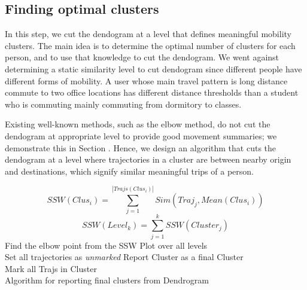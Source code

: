 \subsection{Finding optimal clusters}
In this step, we cut the dendogram at a level that defines meaningful mobility clusters. The main idea is to determine the optimal number of clusters for each person, and to use that knowledge to cut the dendogram. We went against determining a static similarity level to cut dendogram since different people have different forms of mobility. A user whose main travel pattern is long distance commute to two office locations has different distance thresholds than a student who is commuting mainly commuting from dormitory to classes. 

Existing well-known methods, such as the elbow method, do not cut the dendogram at appropriate level to provide good movement summaries; we demonstrate this in Section \label{sec:elbow}. Hence, we design an algorithm that cuts the dendogram at a level where trajectories in a cluster are between nearby origin and destinations, which signify similar meaningful trips of a person.
\newenvironment{badidea}
  {\par\leftskip=2cm}
  {\par}
\begin{algorithm}

\SetAlgoLined
{}
{
\begin{equation}
SSW(Clus_i)= \sum_{j=1}^{|Trajs(Clus_i)|}{Sim(Traj_{j},Mean(Clus_i))}
\end{equation}
\begin{equation}
SSW(Level_k)=\sum_{j=1}^{k}{SSW(Cluster_j)}
\end{equation}
}
Find the elbow point from the SSW Plot over all levels \\
Set all trajectories as \textit{unmarked}
{
{
{
Report Cluster as a final Cluster\\
Mark all Trajs in Cluster
}
}
}
\\

\caption{Algorithm for reporting final clusters from Dendrogram}

\end{algorithm}

